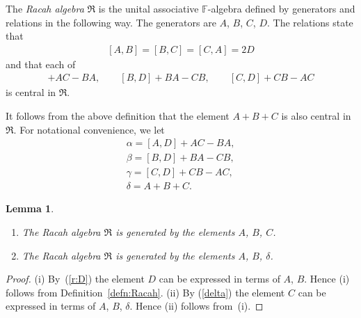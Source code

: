 \documentclass[pdftex]{sigma}
\def\F{\mathbb F}
\numberwithin{equation}{section}
\newtheorem{Lemma}[Theorem]{Lemma}
\begin{document}
\begin{Definition}[{\cite[Definition 3.1]{SH:2017-1}}] \label{defn:Racah}
The {\it Racah algebra} $\Re$ is the unital associative $\F$-algebra defined by generators and relations in the following way. The generators are $A$, $B$, $C$, $D$. The relations state that
\begin{gather}\label{r:D}
[A,B]=[B,C]=[C,A]=2D
\end{gather}
and that each of
\begin{gather*}
[A,D]+AC-BA, \qquad [B,D]+BA-CB, \qquad[C,D]+CB-AC
\end{gather*}
is central in $\Re$.
\end{Definition}
It follows from the above definition that the element $A+B+C$ is also central in $\Re$. For notational convenience, we let
\begin{gather}
\alpha = [A,D]+AC-BA, \label{alpha} \\
\beta = [B,D]+BA-CB,\label{beta}\\
\gamma = [C,D]+CB-AC,\label{gamma}\\
\delta = A+B+C. \label{delta}
\end{gather}

\begin{Lemma}\label{lem:delta}\quad
\begin{enumerate}\itemsep=0pt
\item[$(i)$] The Racah algebra $\Re$ is generated by the elements $A$, $B$, $C$.
\item[$(ii)$] The Racah algebra $\Re$ is generated by the elements $A$, $B$, $\delta$.
\end{enumerate}
\end{Lemma}
\begin{proof}
(i) By~(\ref{r:D}) the element $D$ can be expressed in terms of $A$, $B$. Hence (i) follows from Definition~\ref{defn:Racah}.
(ii) By (\ref{delta}) the element $C$ can be expressed in terms of $A$, $B$, $\delta$. Hence (ii) follows from~(i).
\end{proof}
\end{document}
